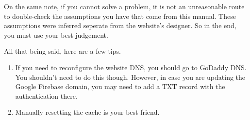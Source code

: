 \documentclass[a4paper]{article}
\begin{document}
On the same note, if you cannot solve a problem, it is not an unreasonable route to double-check the assumptions you have that come from this manual. These assumptions were inferred seperate from the website's designer. So in the end, you must use your best judgement.


\noindent All that being said, here are a few tips.

\begin{enumerate}
  \item If you need to reconfigure the website DNS, you should go to GoDaddy DNS. You shouldn't need to do this though. However, in case you are updating the Google Firebase domain, you may need to add a TXT record with the authentication there.
  \item Manually resetting the cache is your best friend.
\end{enumerate}
\end{document}

